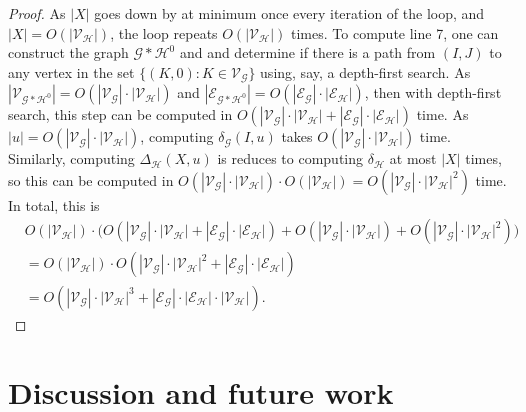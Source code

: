 \documentclass[hidelinks]{article}
\newcommand{\Gc}{\mathcal{G}}  %
\newcommand{\Hc}{\mathcal{H}}  %
\newcommand{\Vc}{\mathcal{V}}
\newcommand{\Ec}{\mathcal{E}}
\newcommand{\shift}[1]{\mathsf{X}_{#1}}
\theoremstyle{definition}
\begin{document}
\begin{proof}
    As \(|X|\) goes down by at minimum once every iteration of the loop, 
    and \(|X| = O(|\Vc_\Hc|)\), the loop repeats \(O(|\Vc_\Hc|)\) times. To compute line 7, 
    one can construct the graph \(\Gc * \Hc^0\) and and determine 
    if there is a path from \((I, J)\) to any vertex in the set 
    \(\{(K, 0) : K \in \Vc_\Gc\}\) using, say, a depth-first search.
    As \(|\Vc_{\Gc * \Hc^0}| = O(|\Vc_\Gc|\cdot|\Vc_\Hc|)\) and 
    \(|\Ec_{\Gc * \Hc^0}| = O(|\Ec_\Gc|\cdot|\Ec_\Hc|)\), then with 
    depth-first search, this step can be computed in \(O(|\Vc_\Gc|\cdot|\Vc_\Hc| + |\Ec_\Gc|\cdot|\Ec_\Hc|)\)
    time. As \(|u| = O(|\Vc_\Gc|\cdot|\Vc_\Hc|)\), computing \(\delta_\Gc(I, u)\) 
    takes \(O(|\Vc_\Gc|\cdot|\Vc_\Hc|)\) time. Similarly, computing 
    \(\Delta_\Hc(X, u)\) is reduces to computing \(\delta_\Hc\) at most \(|X|\) times, so 
    this can be computed in \(O(|\Vc_\Gc|\cdot|\Vc_\Hc|)\cdot O(|\Vc_\Hc|) = O(|\Vc_\Gc| \cdot |\Vc_\Hc|^2)\) time.
    In total, this is 
    \begin{align*}
        & O(|\Vc_\Hc|)\cdot \big( O(|\Vc_\Gc|\cdot|\Vc_\Hc| + |\Ec_\Gc|\cdot|\Ec_\Hc|) + O(|\Vc_\Gc|\cdot|\Vc_\Hc|) + O(|\Vc_\Gc|\cdot|\Vc_\Hc|^2)\big)
        \\ &= O(|\Vc_\Hc|)\cdot O(|\Vc_\Gc|\cdot|\Vc_\Hc|^2 + |\Ec_\Gc|\cdot|\Ec_\Hc|) \\ 
        &= O(|\Vc_\Gc|\cdot|\Vc_\Hc|^3 + |\Ec_\Gc|\cdot|\Ec_\Hc|\cdot|\Vc_\Hc|).
    \end{align*}
\end{proof}

\section{Discussion and future work}

    
\end{document}
